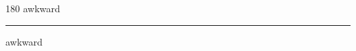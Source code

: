 
\begin{frame}
\begin{center}
\begin{turn}{180}
{\fontsize{2.5cm}{1em}\selectfont awkward}
\end{turn}
\vspace{1em}\par  
\hrule
\vspace{1em}\par  
{\fontsize{2.5cm}{1em}\selectfont awkward}
\end{center}
\end{frame}
